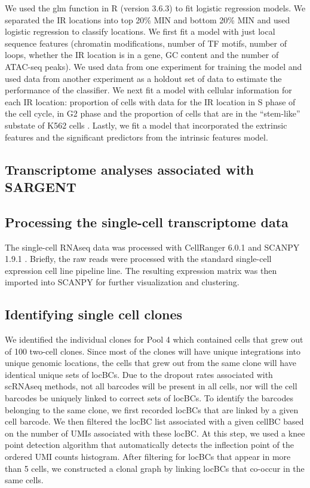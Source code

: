 We used the glm function in R (version 3.6.3) to fit logistic regression models. We separated the IR locations into top 20\% MIN and bottom 20\% MIN and used logistic regression to classify locations. We first fit a model with just local sequence features (chromatin modifications, number of TF motifs, number of loops, whether the IR location is in a gene, GC content and the number of ATAC-seq peaks). We used data from one experiment for training the model and used data from another experiment as a holdout set of data to estimate the performance of the classifier. We next fit a model with cellular information for each IR location: proportion of cells with data for the IR location in S phase of the cell cycle, in G2 phase and the proportion of cells that are in the \enquote{stem-like} substate of K562 cells \cite{litzenburgerum_changhy:SinglecellEpigenomic2017}. Lastly, we fit a model that incorporated the extrinsic features and the significant predictors from the intrinsic features model.

\subsection*{Transcriptome analyses associated with SARGENT}

\subsection*{Processing the single-cell transcriptome data}

The single-cell RNAseq data was processed with CellRanger 6.0.1 and SCANPY 1.9.1 \cite{wolffa_theisfj:SCANPYLargescale2018}. Briefly, the raw reads were processed with the standard single-cell expression cell line pipeline line. The resulting expression matrix was then imported into SCANPY for further visualization and clustering. 

\subsection*{Identifying single cell clones}

We identified the individual clones for Pool 4 which contained cells that grew out of 100 two-cell clones. Since most of the clones will have unique integrations into unique genomic locations, the cells that grew out from the same clone will have identical unique sets of locBCs. Due to the dropout rates associated with scRNAseq methods, not all barcodes will be present in all cells, nor will the cell barcodes be uniquely linked to correct sets of locBCs. To identify the barcodes belonging to the same clone, we first recorded locBCs that are linked by a given cell barcode. We then filtered the locBC list associated with a given cellBC based on the number of UMIs associated with these locBC. At this step, we used a knee point detection algorithm \cite{satopaav_raghavanb:FindingKneedle2011} that automatically detects the inflection point of the ordered UMI counts histogram. After filtering for locBCs that appear in more than 5 cells, we constructed a clonal graph by linking locBCs that co-occur in the same cells.

